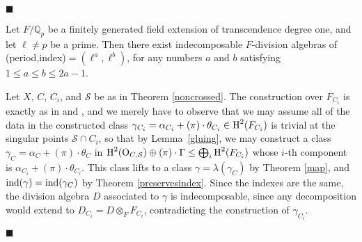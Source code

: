 \documentclass{amsart}
\theoremstyle{plain}
\theoremstyle{definition}
\theoremstyle{remark}
\numberwithin{equation}{section}%
\renewcommand{\H}{{\text{\rm H}}}
\renewcommand{\O}{{\text{\rm O}}}
\newcommand{\Q}{{\mathbb Q}}
\renewcommand{\S}{{\mathcal S}}
\newcommand{\ind}{{\text{\rm ind}}}
\newcommand{\Pf}{{\noindent{\it Proof.}\;\;}}
\begin{document}
\hfill $\blacksquare$

\Theorem
Let $F/\Q_p$ be a finitely generated field extension of transcendence degree one,
and let $\ell\neq p$ be a prime.  Then there exist indecomposable $F$-division algebras
of (period,index)$=(\ell^a,\ell^b)$, for any numbers $a$ and $b$ satisfying
$1\leq a\leq b\leq 2a-1$.
\rm

\Pf
Let $X$, $C$, $C_i$, and $\S$ be as in Theorem \ref{noncrossed}.
The construction over $F_{C_i}$ is exactly as in \cite[Proposition 4.2]{BMT}
and \cite{Br96b},
and we merely have to observe that we may assume all of the data
in the constructed class $\gamma_{C_i}=\alpha_{C_i}+(\pi)\cdot\theta_{C_i}\in\H^2(F_{C_i})$
is trivial at
the singular points $\S\cap C_i$, so that by Lemma~\ref{gluing}, we may construct
a class $\gamma_C=\alpha_C+(\pi)\cdot\theta_C$ in 
$\H^2(\O_{C,\S})\oplus(\pi)\cdot\Gamma
\leq\bigoplus_i\H^2(F_{C_i})$ whose $i$-th component is $\alpha_{C_i}+(\pi)\cdot\theta_{C_i}$.
This class lifts to a class $\gamma=\lambda(\gamma_C)$ by Theorem \ref{map}, 
and $\ind(\gamma)=\ind(\gamma_C)$ by Theorem \ref{preservesindex}.
Since the indexes are the same, the division algebra $D$ associated to $\gamma$
is indecomposable, since any decomposition would extend to
$D_{C_i}=D\otimes_F F_{C_i}$, contradicting the construction of $\gamma_{C_i}$.

\hfill $\blacksquare$


\end{document}
